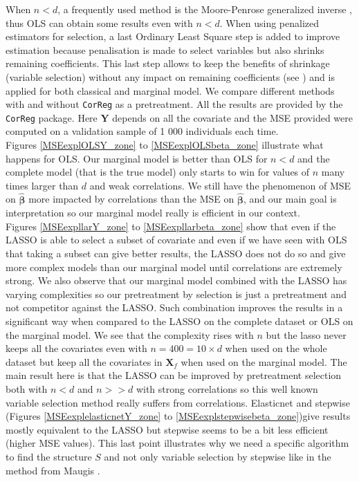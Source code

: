 \documentclass[12pt,a4paper]{report}
\begin{document}
	When $n<d$, a frequently used method is the Moore-Penrose generalized inverse \cite{katsikis2008fast}, thus OLS can obtain some results even with $n<d$. %
	When using penalized estimators for selection, a last Ordinary Least Square step is added to improve estimation because penalisation is made to select variables but also shrinks remaining coefficients. This last step allows to keep the benefits of shrinkage (variable selection) without any impact on remaining coefficients (see \cite{SAM10088}) and is applied for both classical and marginal model.
	We compare different methods with and without {\tt CorReg} as a pretreatment. All the results are provided by the {\tt CorReg} package. Here $\boldsymbol{Y}$ depends on all the covariate and the MSE provided were computed on a validation sample of 1 000 individuals each time. \\
	
	Figures \ref{MSEexplOLSY_zone} to \ref{MSEexplOLSbeta_zone} illustrate what happens for OLS. 
Our marginal model is better than OLS for $n<d$ and the complete model (that is the true model) only starts to win for values of $n$ many times larger than $d$ and weak correlations. We still have the phenomenon of MSE on $\hat{\boldsymbol{\beta}}$ more impacted by correlations than the MSE on $\hat{\boldsymbol{\beta}}$, and our main goal is interpretation so our marginal model really is efficient in our context. \\

Figures \ref{MSEexpllarY_zone} to \ref{MSEexpllarbeta_zone} show that even if the LASSO is able to select a subset of covariate and even if we have seen with OLS that taking a subset can give better results, the LASSO does not do so and give more complex models than our marginal model until correlations are extremely strong. We also observe that our marginal model combined with the LASSO has varying complexities so our pretreatment by selection is just a pretreatment and not competitor against the LASSO. Such combination improves the results in a significant way when compared to the LASSO on the complete dataset or OLS on the marginal model. We see that the complexity rises with $n$ but the lasso never keeps all the covariates even with $n=400=10\times d$ when used on the whole dataset but keep all the covariates in $\boldsymbol{X}_f$ when used on the marginal model. The main result here is that the LASSO can be improved by pretreatment selection both with $n<d$ and $n>>d$ with strong correlations so this well known variable selection method really suffers from correlations. Elasticnet and stepwise (Figures \ref{MSEexplelasticnetY_zone} to \ref{MSEexplstepwisebeta_zone})give results mostly equivalent to the LASSO but stepwise seems to be a bit less efficient (higher MSE values). This last point illustrates why we need a specific algorithm to find the structure $S$ and not only variable selection by stepwise like in the method from Maugis \cite{maugis2009variable}. \\
\end{document}
